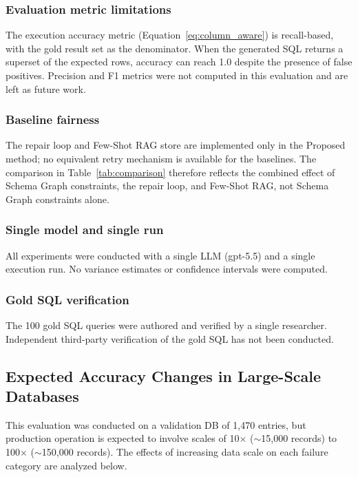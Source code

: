 \documentclass[5p,twocolumn]{elsarticle}
\begin{document}
\subsubsection{Evaluation metric limitations}

The execution accuracy metric (Equation~\ref{eq:column_aware}) is recall-based,
with the gold result set as the denominator.
When the generated SQL returns a superset of the expected rows, accuracy can reach 1.0
despite the presence of false positives.
Precision and F1 metrics were not computed in this evaluation and are left as future work.

\subsubsection{Baseline fairness}

The repair loop and Few-Shot RAG store are implemented only in the Proposed method;
no equivalent retry mechanism is available for the baselines.
The comparison in Table~\ref{tab:comparison} therefore reflects the combined effect of
Schema Graph constraints, the repair loop, and Few-Shot RAG, not Schema Graph constraints alone.

\subsubsection{Single model and single run}

All experiments were conducted with a single LLM (gpt-5.5) and a single execution run.
No variance estimates or confidence intervals were computed.

\subsubsection{Gold SQL verification}

The 100 gold SQL queries were authored and verified by a single researcher.
Independent third-party verification of the gold SQL has not been conducted.

\subsection{Expected Accuracy Changes in Large-Scale Databases}
\label{sec:scale_prediction}

This evaluation was conducted on a validation DB of 1{,}470 entries,
but production operation is expected to involve scales of 10$\times$ (${\sim}$15{,}000 records) to 100$\times$ (${\sim}$150{,}000 records).
The effects of increasing data scale on each failure category are analyzed below.
\end{document}
